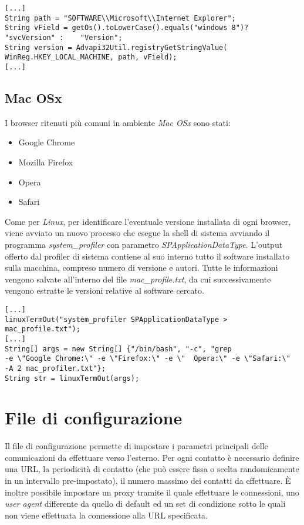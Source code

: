 \vspace{0.5cm}
\begin{lstlisting}
[...]
String path = "SOFTWARE\\Microsoft\\Internet Explorer";
String vField = getOs().toLowerCase().equals("windows 8")? "svcVersion" : 	 "Version";
String version = Advapi32Util.registryGetStringValue(   
WinReg.HKEY_LOCAL_MACHINE, path, vField);
[...]
\end{lstlisting}

\subsection{Mac OSx}
I browser ritenuti pi\`{u} comuni in ambiente \textit{Mac OSx} sono stati:
\begin{itemize}
	\item Google Chrome
	\item Mozilla Firefox
	\item Opera
	\item Safari
\end{itemize}
Come per \textit{Linux}, per identificare l'eventuale versione installata di ogni browser, viene avviato un nuovo processo che esegue la shell di sistema avviando il programma \textit{system\_profiler} con parametro \textit{SPApplicationDataType}. L'output offerto dal profiler di sistema contiene al suo interno tutto il software installato sulla macchina, compreso numero di versione e autori. 
Tutte le informazioni vengono salvate all'interno del file \textit{mac\_profile.txt}, da cui successivamente vengono estratte le versioni relative al software cercato.

\vspace{0.5cm}
\begin{lstlisting}
[...]
linuxTermOut("system_profiler SPApplicationDataType > mac_profile.txt");
[...]
String[] args = new String[] {"/bin/bash", "-c", "grep 
-e \"Google Chrome:\" -e \"Firefox:\" -e \"  Opera:\" -e \"Safari:\" 
-A 2 mac_profiler.txt"};
String str = linuxTermOut(args);
\end{lstlisting}

\section{File di configurazione}
Il file di configurazione permette di impostare i parametri principali delle comunicazioni da effettuare verso l'esterno.
Per ogni contatto \`{e} necessario definire una URL, la periodicit\`{a} di contatto (che pu\`{o} essere fissa o scelta randomicamente in un intervallo pre-impostato), il numero massimo dei contatti da effettuare.
\`{E} inoltre possibile impostare un proxy tramite il quale effettuare le connessioni, uno \textit{user agent} differente da quello di default ed un set di condizione sotto le quali non viene effettuata la connessione alla URL specificata.

